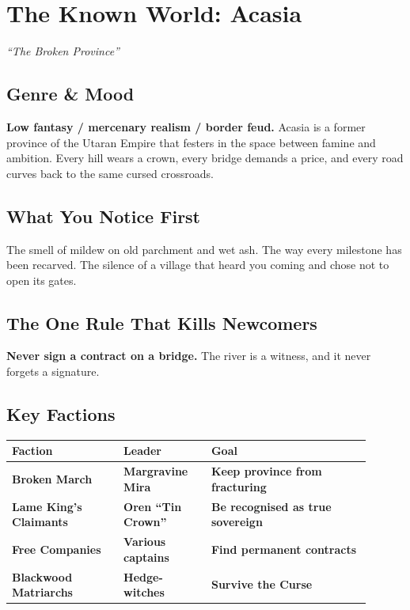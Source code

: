 \documentclass[10pt]{article}
\begin{document}
\section{The Known World: Acasia}
\textit{``The Broken Province''}

\subsection{Genre \& Mood}
\textbf{Low fantasy / mercenary realism / border feud.} Acasia is a former province of the Utaran Empire that festers in the space between famine and ambition. Every hill wears a crown, every bridge demands a price, and every road curves back to the same cursed crossroads.

\subsection{What You Notice First}
The smell of mildew on old parchment and wet ash. The way every milestone has been recarved. The silence of a village that heard you coming and chose not to open its gates.

\subsection{The One Rule That Kills Newcomers}
\textbf{Never sign a contract on a bridge.} The river is a witness, and it never forgets a signature.

\subsection{Key Factions}
\begin{coretable}
\setlength{\tabcolsep}{1.5pt} %
\begin{tabular}{>{\bfseries}p{0.28\linewidth} >{\bfseries}p{0.22\linewidth} >{\bfseries}p{0.4\linewidth}}
\toprule
\textbf{Faction} & \textbf{Leader} & \textbf{Goal} \\
\midrule
Broken March & Margravine Mira & Keep province from fracturing \\
Lame King's Claimants & Oren ``Tin Crown'' & Be recognised as true sovereign \\
Free Companies & Various captains & Find permanent contracts \\
Blackwood Matriarchs & Hedge-witches & Survive the Curse \\
\bottomrule
\end{tabular}
\end{coretable}
\end{document}
